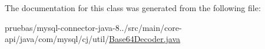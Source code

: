 The documentation for this class was generated from the following file\+:\begin{DoxyCompactItemize}
\item 
pruebas/mysql-\/connector-\/java-\/8../src/main/core-\/api/java/com/mysql/cj/util/\mbox{\hyperlink{_base64_decoder_8java}{Base64\+Decoder.\+java}}\end{DoxyCompactItemize}
